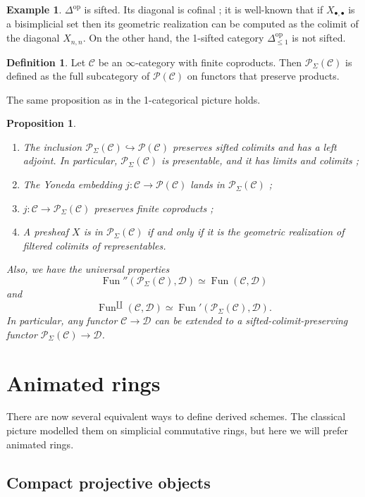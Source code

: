 \documentclass[11pt]{article}
\newtheorem{proposition}[theorem]{Proposition}
\theoremstyle{definition}
\newtheorem{definition}[theorem]{Definition}
\newtheorem{example}[theorem]{Example}
\newcommand{\C}{\mathcal{C}}
\newcommand{\D}{\mathcal{D}}
\newcommand{\Fun}{\operatorname{Fun}}
\newcommand{\op}{\mathrm{op}}
\renewcommand{\P}{\mathcal{P}}
\begin{document}
\begin{example}
    $\Delta^{\op}$ is sifted.
    Its diagonal is cofinal ; it is well-known that if $X_{\bullet, \bullet}$ is a bisimplicial set then its geometric realization can be computed as the colimit of the diagonal $X_{n, n}$.
    On the other hand, the 1-sifted category $\Delta^{\op}_{\leqslant 1}$ is not sifted.
\end{example}

\begin{definition}
    Let $\C$ be an $\infty$-category with finite coproducts.
    Then $\P_{\Sigma}(\C)$ is defined as the full subcategory of $\P(\C)$ on functors that preserve products.
\end{definition}

The same proposition as in the 1-categorical picture holds.
\begin{proposition}
    \begin{enumerate}
        \item The inclusion $\P_{\Sigma}(\C) \hookrightarrow \P(\C)$ preserves sifted colimits and has a left adjoint.
        In particular, $\P_{\Sigma}(\C)$ is presentable, and it has limits and colimits ;
        \item The Yoneda embedding $j : \C \to \P(\C)$ lands in $\P_{\Sigma}(\C)$ ;
        \item $j : \C \to \P_{\Sigma}(\C)$ preserves finite coproducts ;
        \item A presheaf $X$ is in $\P_{\Sigma}(\C)$ if and only if it is the geometric realization of filtered colimits of representables.
    \end{enumerate}
    Also, we have the universal properties
    \[
        \Fun''(\P_{\Sigma}(\C), \D) \simeq \Fun(\C, \D)
    \]
    and
    \[
        \Fun^{\amalg}(\C, \D) \simeq \Fun'(\P_{\Sigma}(\C), \D).
    \]
    In particular, any functor $\C \to \D$ can be extended to a sifted-colimit-preserving functor $\P_{\Sigma}(\C) \to \D$.
\end{proposition}

\section{Animated rings}

There are now several equivalent ways to define derived schemes.
The classical picture modelled them on simplicial commutative rings, but here we will prefer animated rings.

\subsection{Compact projective objects}
\end{document}
